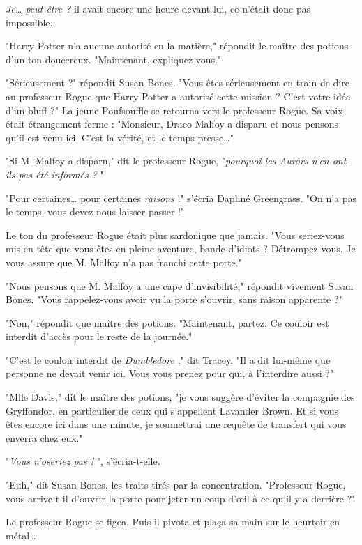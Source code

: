 \emph{Je… peut-être ?}  il avait encore une heure devant lui, ce n'était donc pas impossible.

"Harry Potter n'a aucune autorité en la matière," répondit le maître des potions d'un ton doucereux. "Maintenant, expliquez-vous."

"Sérieusement ?" répondit Susan Bones. "Vous êtes sérieusement en train de dire au professeur Rogue que Harry Potter a autorisé cette mission ? C'est votre idée d'un bluff ?" La jeune Poufsouffle se retourna vers le professeur Rogue. Sa voix était étrangement ferme : "Monsieur, Draco Malfoy a disparu et nous pensons qu'il est venu ici. C'est la vérité, et le temps presse…"

"Si M. Malfoy a disparu," dit le professeur Rogue, "\emph{pourquoi les Aurors n'en ont-ils pas été informés ?} "

"Pour certaines… pour certaines \emph{raisons}  !" s'écria Daphné Greengrass. "On n'a pas le temps, vous devez nous laisser passer !"

Le ton du professeur Rogue était plus sardonique que jamais. "Vous seriez-vous mis en tête que vous êtes en pleine aventure, bande d'idiots ? Détrompez-vous. Je vous assure que M. Malfoy n'a pas franchi cette porte."

"Nous pensons que M. Malfoy a une cape d'invisibilité," répondit vivement Susan Bones. "Vous rappelez-vous avoir vu la porte s'ouvrir, sans raison apparente ?"

"Non," répondit que maître des potions. "Maintenant, partez. Ce couloir est interdit d'accès pour le reste de la journée."

"C'est le couloir interdit de \emph{Dumbledore} ," dit Tracey. "Il a dit lui-même que personne ne devait venir ici. Vous vous prenez pour qui, à l'interdire aussi ?"

"Mlle Davis," dit le maître des potions, "je vous suggère d'éviter la compagnie des Gryffondor, en particulier de ceux qui s'appellent Lavander Brown. Et si vous êtes encore ici dans une minute, je soumettrai une requête de transfert qui vous enverra chez eux."

"\emph{Vous n'oseriez pas !} ", s'écria-t-elle.

"Euh," dit Susan Bones, les traits tirés par la concentration. "Professeur Rogue, vous arrive-t-il d'ouvrir la porte pour jeter un coup d'œil à ce qu'il y a derrière ?"

Le professeur Rogue se figea. Puis il pivota et plaça sa main sur le heurtoir en métal…

